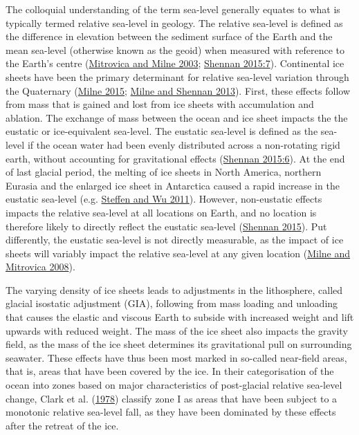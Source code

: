 \documentclass[
  12pt,
  a4paper,
  oneside]{book}
\begin{document}
The colloquial understanding of the term sea-level generally equates to what is typically termed relative sea-level in geology. The relative sea-level is defined as the difference in elevation between the sediment surface of the Earth and the mean sea-level (otherwise known as the geoid) when measured with reference to the Earth's centre (\protect\hyperlink{ref-mitrovica2003}{Mitrovica and Milne 2003}; \protect\hyperlink{ref-shennan2015b}{Shennan 2015:7}). Continental ice sheets have been the primary determinant for relative sea-level variation through the Quaternary (\protect\hyperlink{ref-milne2015}{Milne 2015}; \protect\hyperlink{ref-milne2013}{Milne and Shennan 2013}). First, these effects follow from mass that is gained and lost from ice sheets with accumulation and ablation. The exchange of mass between the ocean and ice sheet impacts the the eustatic or ice-equivalent sea-level. The eustatic sea-level is defined as the sea-level if the ocean water had been evenly distributed across a non-rotating rigid earth, without accounting for gravitational effects (\protect\hyperlink{ref-shennan2015b}{Shennan 2015:6}). At the end of last glacial period, the melting of ice sheets in North America, northern Eurasia and the enlarged ice sheet in Antarctica caused a rapid increase in the eustatic sea-level (e.g. \protect\hyperlink{ref-steffen2011}{Steffen and Wu 2011}). However, non-eustatic effects impacts the relative sea-level at all locations on Earth, and no location is therefore likely to directly reflect the eustatic sea-level (\protect\hyperlink{ref-shennan2015b}{Shennan 2015}). Put differently, the eustatic sea-level is not directly measurable, as the impact of ice sheets will variably impact the relative sea-level at any given location (\protect\hyperlink{ref-milne2008}{Milne and Mitrovica 2008}).

The varying density of ice sheets leads to adjustments in the lithosphere, called glacial isostatic adjustment (GIA), following from mass loading and unloading that causes the elastic and viscous Earth to subside with increased weight and lift upwards with reduced weight. The mass of the ice sheet also impacts the gravity field, as the mass of the ice sheet determines its gravitational pull on surrounding seawater. These effects have thus been most marked in so-called near-field areas, that is, areas that have been covered by the ice. In their categorisation of the ocean into zones based on major characteristics of post-glacial relative sea-level change, Clark et al. (\protect\hyperlink{ref-clark1978}{1978}) classify zone I as areas that have been subject to a monotonic relative sea-level fall, as they have been dominated by these effects after the retreat of the ice.
\end{document}
